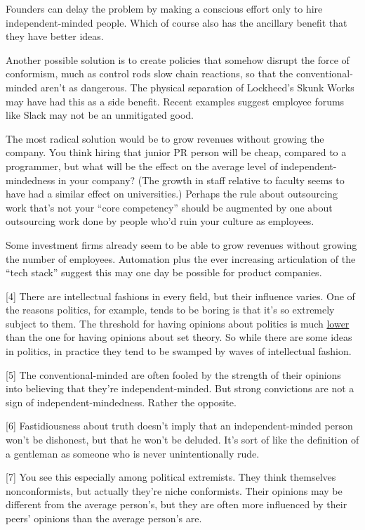 Founders can delay the problem by making a conscious effort only to hire
independent-minded people. Which of course also has the ancillary
benefit that they have better ideas.

Another possible solution is to create policies that somehow disrupt the
force of conformism, much as control rods slow chain reactions, so that
the conventional-minded aren't as dangerous. The physical separation of
Lockheed's Skunk Works may have had this as a side benefit. Recent
examples suggest employee forums like Slack may not be an unmitigated
good.

The most radical solution would be to grow revenues without growing the
company. You think hiring that junior PR person will be cheap, compared
to a programmer, but what will be the effect on the average level of
independent-mindedness in your company? (The growth in staff relative to
faculty seems to have had a similar effect on universities.) Perhaps the
rule about outsourcing work that's not your ``core competency'' should
be augmented by one about outsourcing work done by people who'd ruin
your culture as employees.

Some investment firms already seem to be able to grow revenues without
growing the number of employees. Automation plus the ever increasing
articulation of the ``tech stack'' suggest this may one day be possible
for product companies.

{[}4{]} There are intellectual fashions in every field, but their
influence varies. One of the reasons politics, for example, tends to be
boring is that it's so extremely subject to them. The threshold for
having opinions about politics is much \href{identity.html}{lower} than
the one for having opinions about set theory. So while there are some
ideas in politics, in practice they tend to be swamped by waves of
intellectual fashion.

{[}5{]} The conventional-minded are often fooled by the strength of
their opinions into believing that they're independent-minded. But
strong convictions are not a sign of independent-mindedness. Rather the
opposite.

{[}6{]} Fastidiousness about truth doesn't imply that an
independent-minded person won't be dishonest, but that he won't be
deluded. It's sort of like the definition of a gentleman as someone who
is never unintentionally rude.

{[}7{]} You see this especially among political extremists. They think
themselves nonconformists, but actually they're niche conformists. Their
opinions may be different from the average person's, but they are often
more influenced by their peers' opinions than the average person's are.

